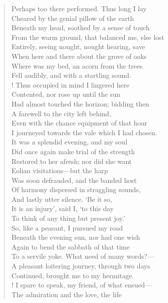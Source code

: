 \begin{verse}
Perhaps too there performed. Thus long I lay  \\
Cheared by the genial pillow of the earth  \\
Beneath my head, soothed by a sense of touch  \\
From the warm ground, that balanced me, else lost	  \\
Entirely, seeing nought, nought hearing, save  \\
When here and there about the grove of oaks  \\
Where was my bed, an acorn from the trees  \\
Fell audibly, and with a startling sound.  \\!
Thus occupied in mind I lingered here	  \\
Contented, nor rose up until the sun  \\
Had almost touched the horizon; bidding then  \\
A farewell to the city left behind,  \\
Even with the chance equipment of that hour  \\
I journeyed towards the vale which I had chosen.	  \\
It was a splendid evening, and my soul  \\
Did once again make trial of the strength  \\
Restored to her afresh; nor did she want  \\
Eolian visitations---but the harp  \\
Was soon defrauded, and the banded host	  \\
Of harmony dispersed in straggling sounds,  \\
And lastly utter silence. `Be it so,  \\
It is an injury', said I, `to this day  \\
To think of any thing but present joy.'  \\
So, like a peasant, I pursued my road	  \\
Beneath the evening sun, nor had one wish  \\
Again to bend the sabbath of that time  \\
To a servile yoke. What need of many words?---  \\
A pleasant loitering journey, through two days  \\
Continued, brought me to my hermitage.	  \\!
I spare to speak, my friend, of what ensued---  \\
The admiration and the love, the life  \\

\end{verse}
